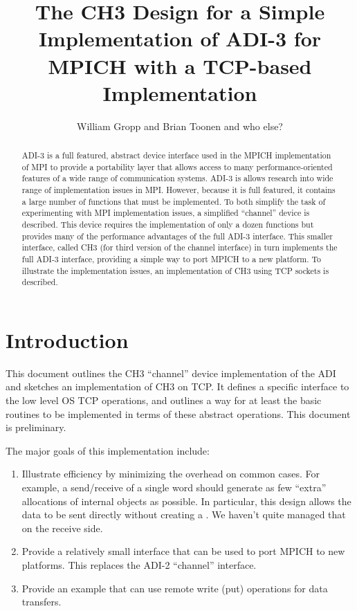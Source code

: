 \documentclass{article}
\begin{document}
\title{The CH3 Design for a Simple Implementation of ADI-3 for MPICH with a
TCP-based Implementation}
\author{William Gropp and Brian Toonen and who else?}
\maketitle

\begin{abstract}
ADI-3 is a full featured, abstract device interface used in the MPICH
implementation of MPI to provide a portability layer that allows
access to many performance-oriented features of a wide range of
communication systems.  ADI-3 is allows research into wide range of
implementation issues in MPI. However, because it is full featured,
it contains a large number of functions that must be implemented.  To
both simplify the task of experimenting with MPI implementation
issues, a simplified ``channel'' device is described.  This device
requires the implementation of only a dozen functions but provides
many of the performance advantages of the full ADI-3 interface.  This
smaller interface, called CH3 (for third version of the channel
interface) in turn implements the full ADI-3 interface, providing a
simple way to port MPICH to a new platform.  To illustrate the
implementation issues, an implementation of CH3 using TCP sockets is
described. 
\end{abstract}

\section{Introduction}
This document outlines the CH3 ``channel'' device implementation of
the ADI and sketches an implementation of CH3 on TCP.  It defines a
specific interface to the low level OS TCP operations, and outlines a way
for at least the basic  routines to be implemented in terms of
these 
abstract operations.  This document is preliminary.

The major goals of this implementation include:
\begin{enumerate}
\item Illustrate efficiency by minimizing the overhead on common cases.
For example, a send/receive of a single word should generate as few ``extra''
allocations of internal objects as possible.  In particular, this
design allows the data to be sent directly without creating a
. We haven't quite managed that on the receive side.

\item Provide a relatively small interface that can be used to port
MPICH to new 
platforms.  This replaces the ADI-2 ``channel'' interface.

\item Provide an example that can use remote write (put) operations for data
transfers.  
\end{enumerate}
\end{document}
